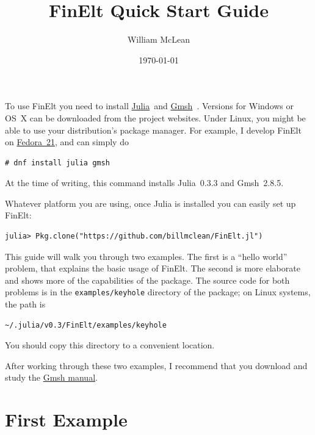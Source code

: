 \documentclass[a4paper,12pt]{article}
\title{FinElt Quick Start Guide}
\author{William McLean}
\date{\today}
\begin{document}
\maketitle
To use FinElt you need to install \href{www.julialan.org}{Julia}~and 
\href{www.geuz.org/gmsh/}{Gmsh}~\cite{Gmsh}.  Versions for Windows or 
OS~X can be downloaded from the project websites.  Under Linux, you
might be able to use your distribution's package manager.  For 
example, I develop FinElt on \href{www.fedoraproject.org}{Fedora~21}, 
and can simply do
\begin{verbatim}
# dnf install julia gmsh 
\end{verbatim}
At the time of writing, this command installs Julia~0.3.3 and
Gmsh~2.8.5.

Whatever platform you are using, once Julia is installed you can 
easily set up FinElt:
\begin{verbatim}
julia> Pkg.clone("https://github.com/billmclean/FinElt.jl")
\end{verbatim}
This guide will walk you through two examples.  The first is a 
``hello world'' problem, that explains the basic usage of FinElt.
The second is more elaborate and shows more of the capabilities of 
the package.  The source code for both problems is in the 
\texttt{examples/keyhole} directory of the package; on Linux systems, 
the path is
\begin{verbatim}
~/.julia/v0.3/FinElt/examples/keyhole
\end{verbatim}
You should copy this directory to a convenient location.

After working through these two examples, I recommend that you 
download and study the 
\href{http://www.geuz.org/gmsh/doc/texinfo/gmsh.pdf}{Gmsh manual}.
\section*{First Example}
\end{document}
